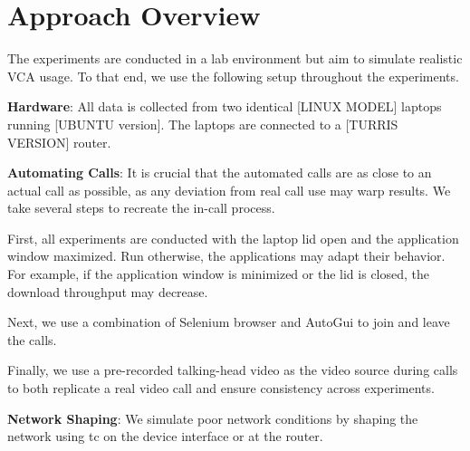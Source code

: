 \section{Approach Overview}\label{sec:approach}

The experiments are conducted in a lab environment but aim to simulate realistic VCA usage. To that end, we use the following setup throughout the experiments.

\textbf{Hardware}: All data is collected from two identical [LINUX MODEL] laptops running [UBUNTU version]. The laptops are connected to a [TURRIS VERSION] router.

\textbf{Automating Calls}: It is crucial that the automated calls are as close to an actual call as possible, as any deviation from real call use may warp results. We take several steps to recreate the in-call process.

First, all experiments are conducted with the laptop lid open and the application window maximized. Run otherwise, the applications may adapt their behavior. For example, if the application window is minimized or the lid is closed, the download throughput may decrease.

Next, we use a combination of Selenium browser and AutoGui to join and leave the calls. 

Finally, we use a pre-recorded talking-head video as the video source during calls to both replicate a real video call and ensure consistency across experiments. 

\textbf{Network Shaping}: We simulate poor network conditions by shaping the network using tc on the device interface or at the router. 